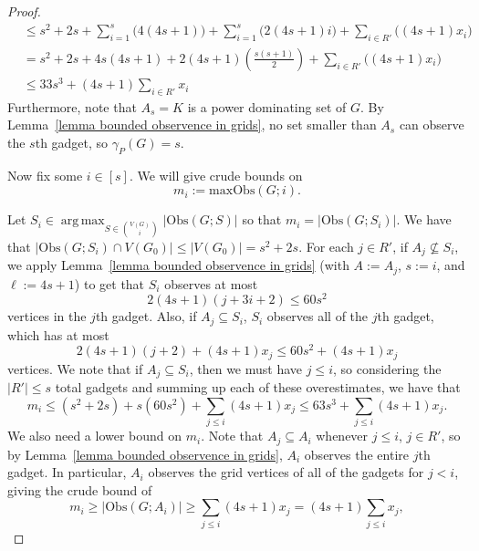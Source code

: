 \documentclass{article}
\DeclareMathOperator*{\argmax}{arg\,max}
\begin{document}
\begin{proof}
\begin{align}
                &\leq s^2+2s+\sum_{i=1}^{s}\Big(4(4s+1)\Big)+\sum_{i=1}^{s}\Big(2(4s+1)i\Big) + \sum_{i\in R'}\Big((4s+1)x_i\Big)\nonumber\\
                &= s^2+2s+4s(4s+1)+2(4s+1)\left(\frac{s(s+1)}{2}\right) +\sum_{i\in R'}\Big((4s+1)x_i\Big)\nonumber\\
                &\leq 33s^3 + (4s+1)\sum_{i\in R'}x_i\label{equation bound on n}
            \end{align}
            Furthermore, note that $A_s=K$ is a power dominating set of $G$.
            By Lemma~\ref{lemma bounded observence in grids}, no set smaller than $A_s$ can observe the $s$th gadget, so $\gamma_P(G)=s$.
            
            Now fix some $i\in [s]$.
            We will give crude bounds on
                \[ m_i:=\mathrm{maxObs}(G;i). \]
            
            Let $\displaystyle S_i\in \argmax_{S\in\binom{V(G)}{i}} |\mathrm{Obs}(G;S)|$ so that $m_i=|\mathrm{Obs}(G;S_i)|$.
            We have that $|\mathrm{Obs}(G;S_i)\cap V(G_0)|\leq |V(G_0)|=s^2+2s$.
            For each $j\in R'$, if $A_j\not\subseteq S_i$, we apply Lemma~\ref{lemma bounded observence in grids} (with $A:=A_j$, $s:=i$, and $\ell:=4s+1$) to get that $S_i$ observes at most
                \[ 
                2(4s+1)(j+3i+2)\leq 60s^2 
                \]
            vertices in the $j$th gadget.
            Also, if $A_j\subseteq S_i$, $S_i$ observes all of the $j$th gadget, which has at most
                \[ 
                2(4s+1)(j+2)+(4s+1)x_j
                \leq 60s^2+(4s+1)x_j 
                \]
            vertices.
            We note that if $A_j\subseteq S_i$, then we must have $j\leq i$, so considering the $|R'|\leq s$ total gadgets and summing up each of these overestimates, we have that
            \begin{equation}\label{equation upper bound on m_i}
                m_i\leq (s^2+2s)+s(60s^2)+ \sum_{j\leq i} (4s+1)x_j\leq 63s^3+\sum_{j\leq i} (4s+1)x_j.
            \end{equation}
            We also need a lower bound on $m_i$.
            Note that $A_j\subseteq A_i$ whenever $j\leq i$, $j\in R'$, so by Lemma~\ref{lemma bounded observence in grids}, $A_i$ observes the entire $j$th gadget. In particular, $A_i$ observes the grid vertices of all of the gadgets for $j<i$, giving the crude bound of 
            \begin{equation}\label{equation lower bound on m_i}
                m_i\geq |\mathrm{Obs}(G;A_i)|\geq \sum_{j\leq i}(4s+1)x_j=(4s+1)\sum_{j\leq i}x_j,
            \end{equation}
            

\end{proof}
\end{document}
